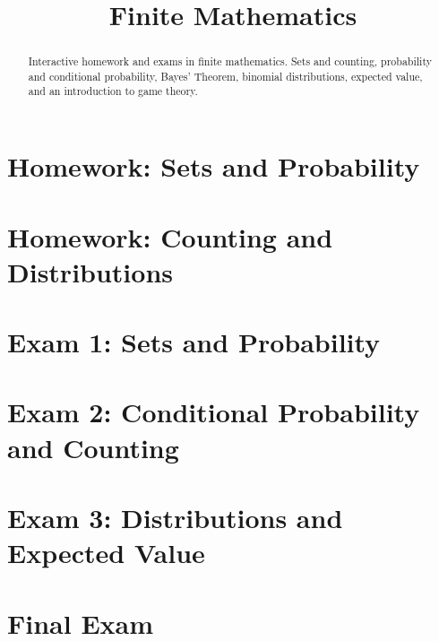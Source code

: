 \documentclass{xourse}
\title{Finite Mathematics}
\author{}
\begin{document}
\begin{abstract}
    Interactive homework and exams in finite mathematics. Sets and counting,
    probability and conditional probability, Bayes' Theorem, binomial distributions,
    expected value, and an introduction to game theory.
\end{abstract}
\maketitle

\part{Homework: Sets and Probability}


\part{Homework: Counting and Distributions}


\part{Exam 1: Sets and Probability}


\part{Exam 2: Conditional Probability and Counting}


\part{Exam 3: Distributions and Expected Value}


\part{Final Exam}

\end{document}
